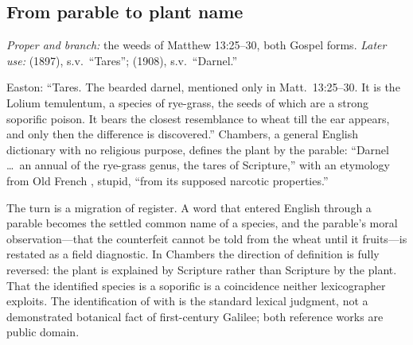 \subsection*{From parable to plant name}

\emph{Proper and branch:} the weeds of Matthew 13:25--30, both Gospel forms.
\emph{Later use:}  (1897), s.v.\ ``Tares'';
 (1908), s.v.\ ``Darnel.''

Easton: ``Tares. The bearded darnel, mentioned only in Matt.\ 13:25--30. It is
the Lolium temulentum, a species of rye-grass, the seeds of which are a strong
soporific poison. It bears the closest resemblance to wheat till the ear
appears, and only then the difference is discovered.'' Chambers, a general
English dictionary with no religious purpose, defines the plant by the
parable: ``Darnel \dots\ an annual of the rye-grass genus, the tares of
Scripture,'' with an etymology from Old French , stupid, ``from
its supposed narcotic properties.''

The turn is a migration of register. A word that entered English through a
parable becomes the settled common name of a species, and the parable's moral
observation---that the counterfeit cannot be told from the wheat until it
fruits---is restated as a field diagnostic. In Chambers the direction of
definition is fully reversed: the plant is explained by Scripture rather than
Scripture by the plant. That the identified species is a soporific is a
coincidence neither lexicographer exploits. The identification of  with  is the standard lexical judgment, not a demonstrated botanical
fact of first-century Galilee; both reference works are public domain.

